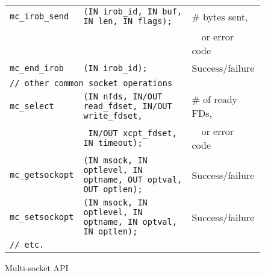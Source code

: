 \documentclass[10pt]{article}
\begin{document}
\begin{figure*}[t]
\begin{small}
\begin{center}
\begin{tabular}{|lll|}
{\tt mc\_irob\_send} & {\tt (IN irob\_id, IN buf, IN len, IN flags);} & \# bytes sent, \\
 & & ~~or error code\\
{\tt mc\_end\_irob} & {\tt (IN irob\_id); }&  Success/failure\\
\hline
\multicolumn{3}{|l|}{\tt // other common socket operations} \\
{\tt mc\_select} & {\tt (IN nfds, IN/OUT read\_fdset, IN/OUT write\_fdset, } & \# of ready FDs,\\
                & {\tt ~IN/OUT xcpt\_fdset, IN timeout); } & ~~or error code\\
{\tt mc\_getsockopt} & {\tt (IN msock, IN optlevel, IN optname, OUT optval, OUT optlen); } & Success/failure\\
{\tt mc\_setsockopt} & {\tt (IN msock, IN optlevel, IN optname, IN optval, IN optlen); } & Success/failure\\
{\tt // etc.} & &\\
\hline
\end{tabular}
\end{center}
\end{small}
\caption{Multi-socket API}
\label{fig:api}
\end{figure*}
\end{document}
